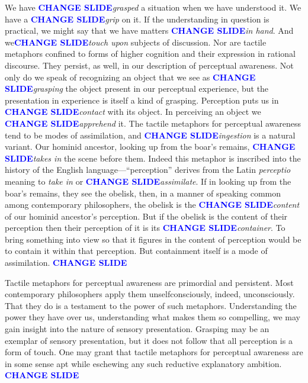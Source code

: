 \documentclass[12pt]{article}
\newcommand{\change}{\textcolor{blue}{\textbf{CHANGE SLIDE}}}
\begin{document}
We have \change \emph{grasped} a situation when we have understood it. We have a \change \emph{grip} on it. If the understanding in question is practical, we might say that we have matters \change \emph{in hand}. And we\change \emph{touch upon} subjects of discussion. Nor are tactile metaphors confined to forms of higher cognition and their expression in rational discourse. They persist, as well, in our description of perceptual awareness. Not only do we speak of recognizing an object that we see as \change \emph{grasping} the object present in our perceptual experience, but the presentation in experience is itself a kind of grasping. Perception puts us in \change \emph{contact} with its object. In perceiving an object we \change \emph{apprehend} it. The tactile metaphors for perceptual awareness tend to be modes of assimilation, and \change \emph{ingestion} is a natural variant. Our hominid ancestor, looking up from the boar's remains, \change \emph{takes in} the scene before them. Indeed this metaphor is inscribed into the history of the English language---``perception'' derives from the Latin \emph{perceptio} meaning to \emph{take in} or \change \emph{assimilate}. If in looking up from the boar's remains, they see the obelisk, then, in a manner of speaking common among contemporary philosophers, the obelisk is the \change \emph{content} of our hominid ancestor's perception. But if the obelisk is the content of their perception then their perception of it is its \change \emph{container}. To bring something into view so that it figures in the content of perception would be to contain it within that perception. But containment itself is a mode of assimilation. \change

Tactile metaphors for perceptual awareness are primordial and persistent. Most contemporary philosophers apply them unselfconsciously, indeed, unconsciously. That they do is a testament to the power of such metaphors. Understanding the power they have over us, understanding what makes them so compelling, we may gain insight into the nature of sensory presentation. Grasping may be an exemplar of sensory presentation, but it does not follow that all perception is a form of touch. One may grant that tactile metaphors for perceptual awareness are in some sense apt while eschewing any such reductive explanatory ambition. \change
\end{document}
